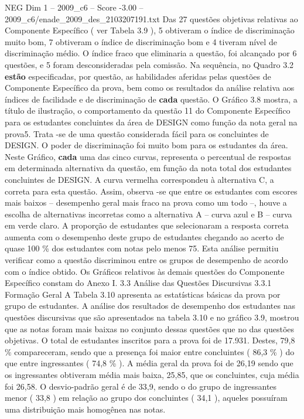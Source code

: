\begin{textsample}{NEG Dim 1 – 2009\_c6 – Score -3.00 – 2009\_c6/enade\_2009\_des\_2103207191.txt}
Das 27 questões objetivas relativas ao Componente Específico ( ver Tabela 3.9 ), 5 obtiveram o índice de discriminação muito bom, 7 obtiveram o índice de discriminação bom e 4 tiveram nível de discriminação médio.
O índice fraco que eliminaria a questão, foi alcançado por 6 questões, e 5 foram desconsideradas pela comissão.
Na sequência, no Quadro 3.2 \textbf{estão} especificadas, por questão, as habilidades aferidas pelas questões de Componente Específico da prova, bem como os resultados da análise relativa aos índices de facilidade e de discriminação de \textbf{cada} questão.
O Gráfico 3.8 mostra, a título de ilustração, o comportamento da questão 11 do Componente Específico para os estudantes concluintes da área de DESIGN como função da nota geral na prova5.
Trata -se de uma questão considerada fácil para os concluintes de DESIGN.
O poder de discriminação foi muito bom para os estudantes da área.
Neste Gráfico, \textbf{cada} uma das cinco curvas, representa o percentual de respostas em determinada alternativa da questão, em função da nota total dos estudantes concluintes de DESIGN.
A curva vermelha correspondeu à alternativa C, a correta para esta questão.
Assim, observa -se que entre os estudantes com escores mais baixos – desempenho geral mais fraco na prova como um todo –, houve a escolha de alternativas incorretas como a alternativa A – curva azul e B – curva em verde claro.
A proporção de estudantes que selecionaram a resposta correta aumenta com o desempenho deste grupo de estudantes chegando ao acerto de quase 100 \% dos estudantes com notas pelo menos 75.
Esta análise permitiu verificar como a questão discriminou entre os grupos de desempenho de acordo com o índice obtido.
Os Gráficos relativos às demais questões do Componente Específico constam do Anexo I. 3.3 Análise das Questões Discursivas 3.3.1 Formação Geral A Tabela 3.10 apresenta as estatísticas básicas da prova por grupo de estudantes.
A análise dos resultados de desempenho dos estudantes nas questões discursivas que são apresentados na tabela 3.10 e no gráfico 3.9, mostrou que as notas foram mais baixas no conjunto dessas questões que no das questões objetivas.
O total de estudantes inscritos para a prova foi de 17.931.
Destes, 79,8 \% compareceram, sendo que a presença foi maior entre concluintes ( 86,3 \% ) do que entre ingressantes ( 74,8 \% ).
A média geral da prova foi de 26,19 sendo que os ingressantes obtiveram média mais baixa, 25,85, que os concluintes, cuja média foi 26,58.
O desvio-padrão geral é de 33,9, sendo o do grupo de ingressantes menor ( 33,8 ) em relação ao grupo dos concluintes ( 34,1 ), aqueles possuíram uma distribuição mais homogênea nas notas.

\end{textsample}
